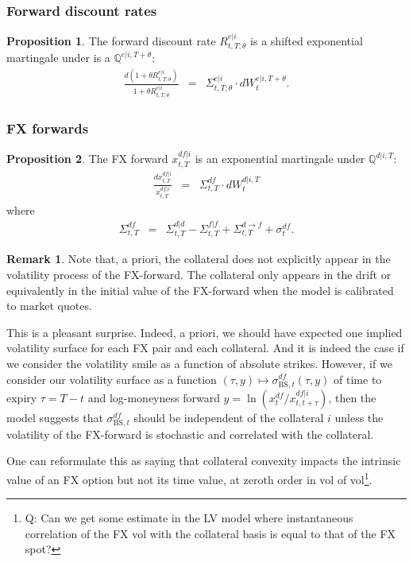 \documentclass[11pt,english]{amsart}
\newcommand{\BS}{\mathrm{BS}}
\newcommand{\QQ}{\mathbb{Q}}
\theoremstyle{definition}
\newtheorem{prop}{Proposition}
\newtheorem{rema}{Remark}
\begin{document}
\subsubsection{Forward discount rates}

\begin{prop}
The forward discount rate $R^{e|i}_{t,T;\theta}$ is a shifted exponential martingale under is a $\QQ^{e|i,T+\theta}$:
\begin{eqnarray}
	\frac{d (1+\theta R^{e|i}_{t,T;\theta})}{1+\theta R^{e|i}_{t,T;\theta}}  
	&=&   \Sigma^{e|i}_{t,T;\theta} \cdot dW^{e|i,T+\theta}_t .
\end{eqnarray} 
\end{prop}


\subsubsection{FX forwards}

\begin{prop}
The FX forward $x^{df|i}_{t,T}$ is an exponential martingale under $\QQ^{d|i,T}$:  
\begin{eqnarray}
  \frac{dx^{df|i}_{t,T}}{x^{df|i}_{t,T}} &=& \Sigma^{df}_{t,T} \cdot dW^{d|i,T}_{t} 
\end{eqnarray}
where 
\begin{eqnarray}
  \Sigma^{df}_{t,T} &=& \Sigma^{d|d}_{t,T} - \Sigma^{f|f}_{t,T} +\Sigma^{d\to f}_{t,T}  + \sigma^{df}_t  .
\end{eqnarray}
\end{prop}

\begin{rema}
Note that, a priori, the collateral does not explicitly appear in the volatility process of the FX-forward. The collateral only appears in the drift or equivalently in the initial value of the FX-forward when the model is calibrated to market quotes.  

This is a pleasant surprise. Indeed, a priori, we should have expected one implied volatility surface for each FX pair and each collateral. And it is indeed the case if we consider the volatility smile as a function of absolute strikes. However, if we consider our volatility surface as a function $(\tau,y)\mapsto \sigma^{df}_{\BS,t}(\tau,y)$ of time to expiry $\tau = T-t$ and log-moneyness forward $y = \ln (x^{df}_t / x^{df|i}_{t,t+\tau})$, then the model suggests that $\sigma^{df}_{\BS,t}$ should be independent of the collateral $i$ unless the volatility of the FX-forward is stochastic and correlated with the collateral. 

One can reformulate this as saying that collateral convexity impacts the intrinsic value of an FX option but not its time value, at zeroth order in vol of vol\footnote{Q: Can we get some estimate in the LV model where instantaneous correlation of the FX vol with the collateral basis is equal to that of the FX spot? }.  
\end{rema}
\end{document}
